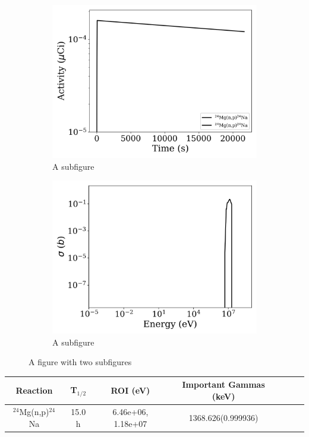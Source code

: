 \begin{figure}[h]
\centering
\begin{subfigure}{.5\textwidth}
  \centering
     \includegraphics[width=.8\textwidth]{plot/Mg-24(n,p)Na-24_library1} 

  \caption{A subfigure}
  \label{fig:sub1}
\end{subfigure}%
\begin{subfigure}{.5\textwidth}
  \centering
     \includegraphics[width=.8\textwidth]{plot/Mg-24(n,p)Na-24} 

  \caption{A subfigure}
  \label{fig:sub2}
\end{subfigure}
\caption{A figure with two subfigures}
\label{fig:test}
\end{figure}

\begin{table}[h]
\centering
\begin{tabular}{ |c|c|c|c|c|c|c| }
 \hline
 Reaction & T$_{1/2}$ & ROI (eV) & Important Gammas (keV) \\
 \hline 
 $^{24}$Mg(n,p)$^{24}$Na & 15.0 h & 6.46e+06, 1.18e+07 & 1368.626(0.999936) \\ 
\hline
\end{tabular}
\end{table}
